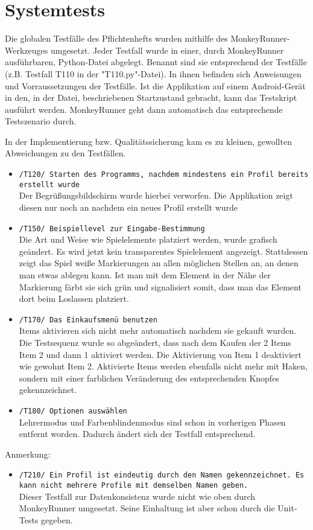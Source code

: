 \section{Systemtests}

Die globalen Testfälle des Pflichtenhefts wurden mithilfe des MonkeyRunner-Werkzeuges umgesetzt.
Jeder Testfall wurde in einer, durch MonkeyRunner ausführbaren, Python-Datei abgelegt. Benannt sind sie entsprechend der Testfälle
(z.B. Testfall T110  in der "T110.py"-Datei). In ihnen befinden sich Anweisungen und Vorraussetzungen der Testfälle. Ist die Applikation auf einem Android-Gerät in den, in der Datei, beschriebenen Startzustand gebracht, kann das Testskript ausführt werden. MonkeyRunner geht dann automatisch das entsprechende Testszenario durch.

In der Implementierung bzw. Qualitätssicherung kam es zu kleinen, gewollten Abweichungen zu den Testfällen.

\begin{itemize}
	\item \texttt{/T120/ Starten des Programms, nachdem mindestens ein Profil bereits erstellt wurde}\\
		Der Begrüßungsbildschirm wurde hierbei verworfen. Die Applikation zeigt diesen nur noch an nachdem ein neues Profil 	erstellt wurde
	\item \texttt{/T150/ Beispiellevel zur Eingabe-Bestimmung}\\ 
		Die Art und Weise wie Spielelemente platziert werden, wurde grafisch geändert. Es wird jetzt kein transparentes Spielelement angezeigt. Stattdessen zeigt das Spiel weiße Markierungen an allen möglichen Stellen an, an denen man etwas ablegen kann. Ist man mit dem Element in der Nähe der Markierung färbt sie sich grün und signalisiert somit, dass man das Element dort beim Loslassen platziert.
	\item \texttt{/T170/ Das Einkaufsmenü benutzen}\\ 
		Items aktivieren sich nicht mehr automatisch nachdem sie gekauft wurden. Die Testsequenz wurde so abgeändert, dass nach dem Kaufen der 2 Items Item 2 und dann 1 aktiviert werden. Die Aktivierung von Item 1 deaktiviert wie gewohnt Item 2. 
		Aktivierte Items werden ebenfalls nicht mehr mit Haken, sondern mit einer farblichen Veränderung des entsprechenden Knopfes gekennzeichnet.
	\item \texttt{/T180/ Optionen auswählen}\\
		Lehrermodus und Farbenblindenmodus sind schon in vorherigen Phasen entfernt worden. Dadurch ändert sich der Testfall entsprechend.
\end{itemize}

Anmerkung:
\begin{itemize}
\item \texttt{/T210/ Ein Profil ist eindeutig durch den Namen gekennzeichnet. Es kann nicht mehrere Profile mit demselben Namen geben.}\\ 
	Dieser Testfall zur Datenkonsistenz wurde nicht wie oben durch MonkeyRunner umgesetzt. Seine Einhaltung ist aber schon durch die Unit-Tests gegeben.
\end{itemize}
